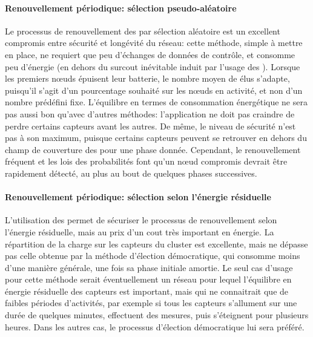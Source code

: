 \paragraph{Renouvellement périodique: sélection pseudo-aléatoire}
Le processus de renouvellement des \cns par sélection aléatoire est un excellent compromis entre sécurité et longévité du réseau: cette méthode, simple à mettre en place, ne requiert que peu d'échanges de données de contrôle, et consomme peu d'énergie (en dehors du surcout inévitable induit par l'usage des \cns).
Lorsque les premiers nœuds épuisent leur batterie, le nombre moyen de \cns élus s'adapte, puisqu'il s'agit d'un pourcentage souhaité sur les nœuds en activité, et non d'un nombre prédéfini fixe.
L'équilibre en termes de consommation énergétique ne sera pas aussi bon qu'avec d'autres méthodes: l'application ne doit pas craindre de perdre certains capteurs avant les autres.
De même, le niveau de sécurité n'est pas à son maximum, puisque certains capteurs peuvent se retrouver en dehors du champ de couverture des \cns pour une phase donnée.
Cependant, le renouvellement fréquent et les lois des probabilités font qu'un nœud compromis devrait être rapidement détecté, au plus au bout de quelques phases successives.

\paragraph{Renouvellement périodique: sélection selon l'énergie résiduelle}
L'utilisation des \vns permet de sécuriser le processus de renouvellement selon l'énergie résiduelle, mais au prix d'un cout très important en énergie.
La répartition de la charge sur les capteurs du cluster est excellente, mais ne dépasse pas celle obtenue par la méthode d'élection démocratique, qui consomme moins d'une manière générale, une fois sa phase initiale amortie.
Le seul cas d'usage pour cette méthode serait éventuellement un réseau pour lequel l'équilibre en énergie résiduelle des capteurs est important, mais qui ne connaitrait que de faibles périodes d'activités, par exemple si tous les capteurs s'allument sur une durée de quelques minutes, effectuent des mesures, puis s'éteignent pour plusieurs heures.
Dans les autres cas, le processus d'élection démocratique lui sera préféré.

